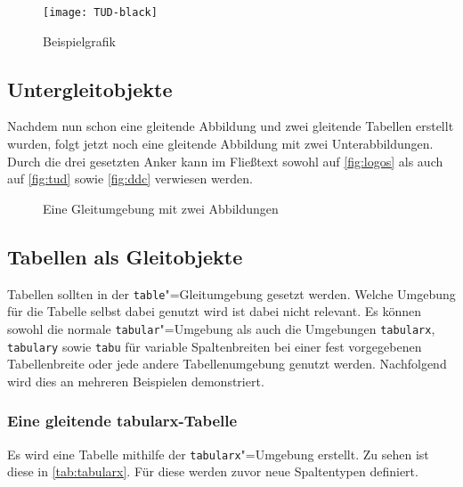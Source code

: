 \documentclass[english,ngerman]{tudscrreprt}
\begin{document}
\begin{figure}
\centering
\texttt{[image: TUD-black]}
\caption{Beispielgrafik}\label{fig:example}
\end{figure}

\subsection{Untergleitobjekte}
Nachdem nun schon eine gleitende Abbildung und zwei gleitende Tabellen
erstellt wurden, folgt jetzt noch eine gleitende Abbildung mit zwei
Unterabbildungen. Durch die drei gesetzten Anker kann im Fließtext
sowohl auf \autoref{fig:logos} als auch auf \autoref{fig:tud} sowie
\autoref{fig:ddc} verwiesen werden.

\begin{figure}
%
  {\caption{Eine Gleitumgebung mit zwei Abbildungen}\label{fig:logos}}%
\end{figure}

\subsection{Tabellen als Gleitobjekte}
Tabellen sollten in der \texttt{table}"=Gleitumgebung gesetzt werden.
Welche Umgebung für die Tabelle selbst dabei genutzt wird ist dabei
nicht relevant. Es können sowohl die normale \texttt{tabular}"=Umgebung
als auch die Umgebungen \texttt{tabularx}, \texttt{tabulary} sowie
\texttt{tabu} für variable Spaltenbreiten bei einer fest vorgegebenen
Tabellenbreite oder jede andere Tabellenumgebung genutzt werden.
Nachfolgend wird dies an mehreren Beispielen demonstriert.

\subsubsection{Eine gleitende tabularx-Tabelle}
Es wird eine Tabelle mithilfe der \texttt{tabularx}"=Umgebung erstellt.
Zu sehen ist diese in \autoref{tab:tabularx}. Für diese werden zuvor
neue Spaltentypen definiert.

\end{document}
